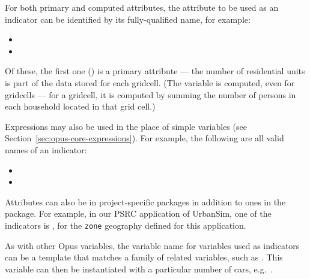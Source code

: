 For both primary \primaryattributesindex and computed attributes,
\computedattributesindex the attribute \attributesindex to be used as an
indicator \indicatorsindex can be identified by its fully-qualified name,
for example:

\begin{itemize}
\tight
\item {}
\item {}
\end{itemize}

Of these, the first one () is a
primary \primaryattributesindex attribute --- the number of residential
units is part of the data stored for each gridcell. 
\computedattributesindex (The variable
 is computed, even for
gridcells --- for a gridcell, it is computed by summing the number of
persons in each household located in that grid cell.) 

Expressions may also be used in the place of simple variables 
(see Section~\ref{sec:opus-core-expressions}). For example, the following are
all valid names of an indicator: 

\begin{itemize}
\tight
\item {}
\item {}
\end{itemize}

Attributes \attributesindex can also be in project-specific packages in
addition to ones in the  package.  For example, in our
PSRC \psrcindex application of UrbanSim, one of the indicators
\indicatorsindex is
, for the
\verb|zone| geography defined for this application.

As with other Opus variables, \variablesindex the variable \variablesindex
name for variables \variablesindex used as indicators \indicatorsindex can
be a template that matches a family of related variables, \variablesindex
such as .  This variable
\variablesindex can then be instantiated with a particular number of cars,
e.g.\ .

